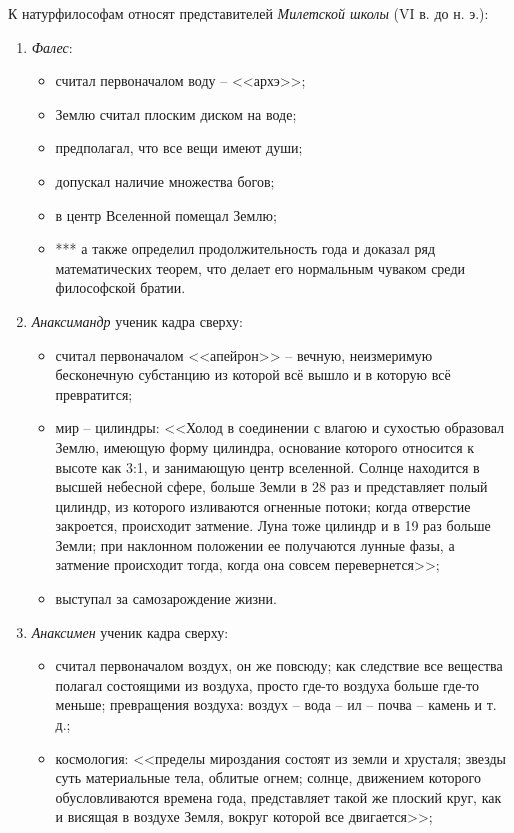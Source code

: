 К натурфилософам относят представителей \textit{Милетской школы} (VI в. до н. э.):
\begin{enumerate}
	\itemsep-1ex
	\item \textit{Фалес}:
	\begin{itemize}
		\itemsep-.5ex
		\item считал первоначалом воду -- <<архэ>>;
		\item Землю считал плоским диском на воде;
		\item предполагал, что все вещи имеют души;
		\item допускал наличие множества богов;
		\item в центр Вселенной помещал Землю;
		\item *** а также определил продолжительность года и доказал ряд математических теорем, что делает его нормальным чуваком среди философской братии.
	\end{itemize}
	\item \textit{Анаксимандр} ученик кадра сверху:
	\begin{itemize}
		\itemsep-.5ex
		\item считал первоначалом <<апейрон>> -- вечную, неизмеримую бесконечную субстанцию из которой всё вышло и в которую всё превратится;
		\item мир -- цилиндры: <<Холод в соединении с влагою и сухостью образовал Землю, имеющую форму цилиндра, основание которого относится к высоте как 3:1, и занимающую центр вселенной. Солнце находится в высшей небесной сфере, больше Земли в 28 раз и представляет полый цилиндр, из которого изливаются огненные потоки; когда отверстие закроется, происходит затмение. Луна тоже цилиндр и в 19 раз больше Земли; при наклонном положении ее получаются лунные фазы, а затмение происходит тогда, когда она совсем перевернется>>;
		\item выступал за самозарождение жизни.
	\end{itemize}
	\item \textit{Анаксимен} ученик кадра сверху:
	\begin{itemize}
		\itemsep-.5ex
		\item считал первоначалом воздух, он же повсюду; как следствие все вещества полагал состоящими из воздуха, просто где-то воздуха больше где-то меньше; превращения воздуха: воздух -- вода -- ил -- почва -- камень и т. д.; 
		\item космология: <<пределы мироздания состоят из земли и хрусталя; звезды суть материальные тела, облитые огнем; солнце, движением которого обусловливаются времена года, представляет такой же плоский круг, как и висящая в воздухе Земля, вокруг которой все двигается>>;
	\end{itemize}
\end{enumerate}

